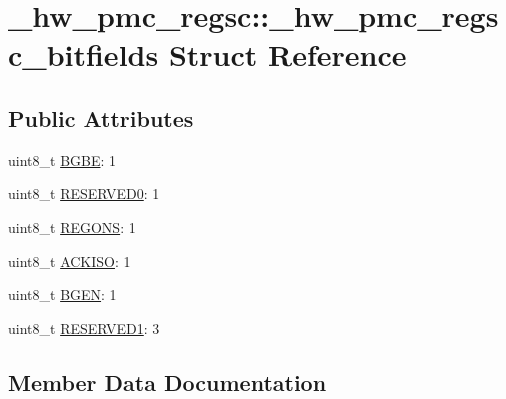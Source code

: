 \hypertarget{struct__hw__pmc__regsc_1_1__hw__pmc__regsc__bitfields}{}\section{\+\_\+hw\+\_\+pmc\+\_\+regsc\+:\+:\+\_\+hw\+\_\+pmc\+\_\+regsc\+\_\+bitfields Struct Reference}
\label{struct__hw__pmc__regsc_1_1__hw__pmc__regsc__bitfields}
\subsection*{Public Attributes}
\begin{DoxyCompactItemize}
\item 
uint8\+\_\+t \hyperlink{struct__hw__pmc__regsc_1_1__hw__pmc__regsc__bitfields_aebbf9fad62138068774e499ec6bbaf40}{B\+G\+BE}\+: 1
\item 
uint8\+\_\+t \hyperlink{struct__hw__pmc__regsc_1_1__hw__pmc__regsc__bitfields_a6d44bdcf4f259cc32c9d9b1047648509}{R\+E\+S\+E\+R\+V\+E\+D0}\+: 1
\item 
uint8\+\_\+t \hyperlink{struct__hw__pmc__regsc_1_1__hw__pmc__regsc__bitfields_a259fa03c128c1501ac32458f135e58c0}{R\+E\+G\+O\+NS}\+: 1
\item 
uint8\+\_\+t \hyperlink{struct__hw__pmc__regsc_1_1__hw__pmc__regsc__bitfields_a81389b7d8c03b131a397994392adad39}{A\+C\+K\+I\+SO}\+: 1
\item 
uint8\+\_\+t \hyperlink{struct__hw__pmc__regsc_1_1__hw__pmc__regsc__bitfields_abef439b8d81e91bcd5b95e3f322f9f3d}{B\+G\+EN}\+: 1
\item 
uint8\+\_\+t \hyperlink{struct__hw__pmc__regsc_1_1__hw__pmc__regsc__bitfields_a8d81d7cceae356f8c438c23253a6b2fb}{R\+E\+S\+E\+R\+V\+E\+D1}\+: 3
\end{DoxyCompactItemize}


\subsection{Member Data Documentation}
